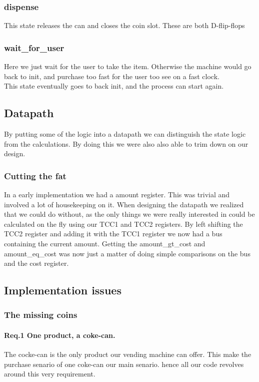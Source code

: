 \subsubsection{dispense}
This state releases the can and closes the coin slot. These are both D-flip-flops

\subsubsection{wait\_for\_user}
Here we just wait for the user to take the item. Otherwise the machine would go back to init, and purchase too fast for the user too see on a fast clock.\\
This state eventually goes to back init, and the process can start again.

\subsection{Datapath}
By putting some of the logic into a datapath we can distinguish the state logic from the calculations. By doing this we were also also able to trim down on our design.
\subsubsection{Cutting the fat}
In a early implementation we had a amount register. This was trivial and involved a lot of housekeeping on it. When designing the datapath we realized that we could do without, as the only things we were really interested in could be calculated on the fly using our TCC1 and TCC2 registers. By left shifting the TCC2 register and adding it with the TCC1 register we now had a bus containing the current amount. Getting the amount\_gt\_cost and amount\_eq\_cost was now just a matter of doing simple comparisons on the bus and the cost register.


\subsection{Implementation issues}
\label{sec:implementation_issues}
\subsubsection{The missing coins}
\label{sec:missing_coins}

\paragraph{Req.1 One product, a coke-can.}
The cocke-can is the only product our vending machine can offer. This make the purchase senario of one coke-can our main senario. hence all our code revolves around this very requirement.

